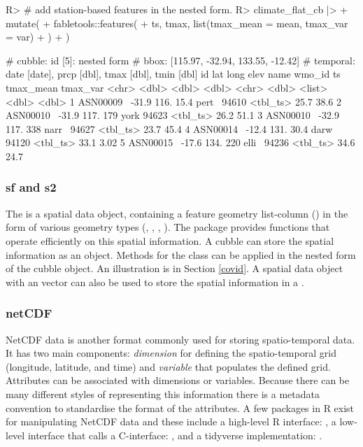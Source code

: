 \documentclass[
]{jss}
\begin{document}
\begin{CodeChunk}
\begin{CodeInput}
R> # add station-based features in the nested form.
R> climate_flat_cb |> 
+   mutate(
+     fabletools::features(
+       ts, tmax, list(tmax_mean = mean, tmax_var = var)
+       )
+   )
\end{CodeInput}
\begin{CodeOutput}
# cubble:   id [5]: nested form
# bbox:     [115.97, -32.94, 133.55, -12.42]
# temporal: date [date], prcp [dbl], tmax [dbl], tmin [dbl]
  id          lat  long  elev name  wmo_id ts       tmax_mean tmax_var
  <chr>     <dbl> <dbl> <dbl> <chr>  <dbl> <list>       <dbl>    <dbl>
1 ASN00009~ -31.9  116.  15.4 pert~  94610 <tbl_ts>      25.7    38.6 
2 ASN00010~ -31.9  117. 179   york   94623 <tbl_ts>      26.2    51.1 
3 ASN00010~ -32.9  117. 338   narr~  94627 <tbl_ts>      23.7    45.4 
4 ASN00014~ -12.4  131.  30.4 darw~  94120 <tbl_ts>      33.1     3.02
5 ASN00015~ -17.6  134. 220   elli~  94236 <tbl_ts>      34.6    24.7 
\end{CodeOutput}
\end{CodeChunk}

\hypertarget{sf-and-s2}{%
\subsubsection{sf and s2}\label{sf-and-s2}}

The  is a spatial data object, containing a feature geometry list-column () in the form of various geometry types (, , , ). The  package provides functions that operate efficiently on this spatial information. A cubble can store the spatial information as an  object. Methods for the  class can be applied in the nested form of the cubble object. An illustration is in Section \ref{covid}. A spatial data object with an  vector can also be used to store the spatial information in a .

\hypertarget{netcdf}{%
\subsubsection{netCDF}\label{netcdf}}

NetCDF data is another format commonly used for storing spatio-temporal data. It has two main components: \emph{dimension} for defining the spatio-temporal grid (longitude, latitude, and time) and \emph{variable} that populates the defined grid. Attributes can be associated with dimensions or variables. Because there can be many different styles of representing this information there is a metadata convention \citep{hassell_data_2017} to standardise the format of the attributes. A few packages in R exist for manipulating NetCDF data and these include a high-level R interface:  \citep{ncdf4}, a low-level interface that calls a C-interface:  \citep{rnetcdf}, and a tidyverse implementation:  \citep{tidync}.
\end{document}
